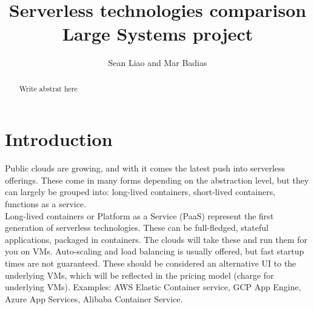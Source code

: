 \documentclass[11pt]{article}
\title{
  Serverless technologies comparison\\
  \large Large Systems project}
\author{Sean Liao and Mar Badias}
\begin{document}
\maketitle






\begin{abstract}
Write abstrat here
\end{abstract}

\newpage

\section{Introduction}
\label{introduction}


Public clouds are growing, and with it comes the latest push into serverless offerings. These come in many forms depending on the abstraction level, but they can largely be grouped into: long-lived containers, short-lived containers, functions as a service. \\

Long-lived containers or Platform as a Service (PaaS) represent the first generation of serverless technologies. These can be full-fledged, stateful applications, packaged in containers. The clouds will take these and run them for you on VMs. Auto-scaling and load balancing is usually offered, but fast startup times are not guaranteed. These should be considered an alternative UI to the underlying VMs, which will be reflected in the pricing model (charge for underlying VMs). Examples: AWS Elastic Container service, GCP App Engine, Azure App Services, Alibaba Container Service. \\
\end{document}
